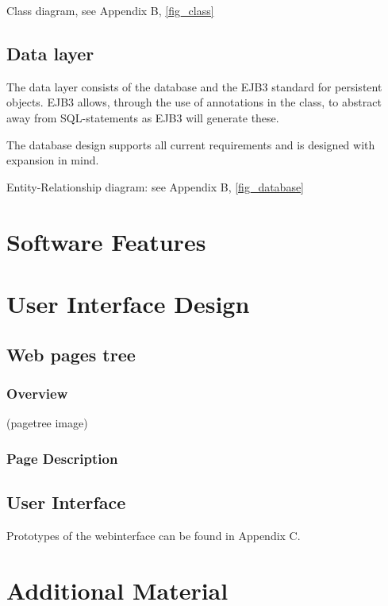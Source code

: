 \documentclass[salesmen, twoside]{../../../templates/latex/2009/softproj}
\begin{document}
\begin{projdoc}
Class diagram, see Appendix B, \ref{fig_class}

\section{Data layer}
The data layer consists of the database and the EJB3 standard for persistent objects. EJB3 allows, through the use of annotations in the class, to abstract away from SQL-statements as EJB3 will generate these.

The database design supports all current requirements and is designed with expansion in mind.

Entity-Relationship diagram: see Appendix B, \ref{fig_database}

\chapter{Software Features}




\chapter{User Interface Design \label{UI Design}}
\section{Web pages tree}
\subsection{Overview}
(pagetree image)
\subsection{Page Description}
\section{User Interface}
Prototypes of the webinterface can be found in Appendix C.

\chapter{Additional Material \label{Additional}}

\end{projdoc}
\end{document}
